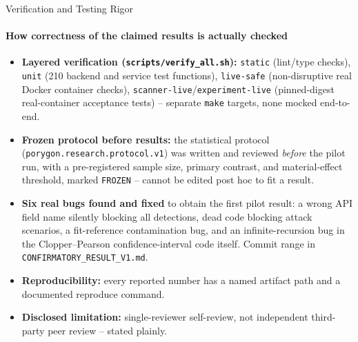 \documentclass[aspectratio=169, 11pt]{beamer}
\begin{document}
\begin{frame}{Verification and Testing Rigor}
\framesubtitle{How correctness of the claimed results is actually checked}
\scriptsize
\begin{itemize}
    \setlength{\itemsep}{3pt}
    \item \textbf{Layered verification (\texttt{scripts/verify\_all.sh}):}
    \texttt{static} (lint/type checks), \texttt{unit} (210 backend and
    service test functions), \texttt{live-safe} (non-disruptive real
    Docker container checks), \texttt{scanner-live}/\texttt{experiment-live}
    (pinned-digest real-container acceptance tests) -- separate
    \texttt{make} targets, none mocked end-to-end.

    \item \textbf{Frozen protocol before results:} the statistical
    protocol (\texttt{porygon.research.protocol.v1}) was written and
    reviewed \emph{before} the pilot run, with a pre-registered
    sample size, primary contrast, and material-effect threshold, marked
    \texttt{FROZEN} -- cannot be edited post hoc to fit a result.

    \item \textbf{Six real bugs found and fixed} to obtain the first
    pilot result: a wrong API field name silently blocking all
    detections, dead code blocking attack scenarios, a fit-reference
    contamination bug, and an infinite-recursion bug in the
    Clopper--Pearson confidence-interval code itself. Commit range in
    \texttt{CONFIRMATORY\_RESULT\_V1.md}.

    \item \textbf{Reproducibility:} every reported number has a named
    artifact path and a documented reproduce command.

    \item \textbf{Disclosed limitation:} single-reviewer self-review, not
    independent third-party peer review -- stated plainly.
\end{itemize}
\end{frame}
\end{document}
